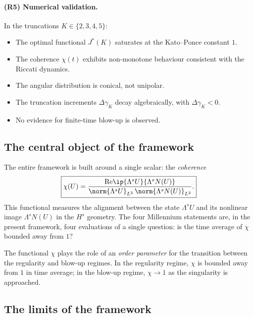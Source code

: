 \paragraph{(R5) Numerical validation.}
In the truncations $K\in\{2,3,4,5\}$:
\begin{itemize}[leftmargin=*]
\item The optimal functional $J^\ast(K)$ saturates at the 
      Kato--Ponce constant $1$.
\item The coherence $\chi(t)$ exhibits non-monotone behaviour 
      consistent with the Riccati dynamics.
\item The angular distribution is conical, not unipolar.
\item The truncation increments $\Delta\gamma_K$ decay 
      algebraically, with $\Delta\gamma_K<0$.
\item No evidence for finite-time blow-up is observed.
\end{itemize}

\subsection{The central object of the framework}
\label{ssec:central-object}

The entire framework is built around a single scalar: the 
\emph{coherence}
\begin{equation}\label{eq:chi-central}
\boxed{
\chi(U) = 
\frac{\mathrm{Re}\ip{\Lambda^s U}{\Lambda^s N(U)}}
     {\norm{\Lambda^s U}_{L^2}\,\norm{\Lambda^s N(U)}_{L^2}}.
}
\end{equation}
This functional measures the alignment between the state 
$\Lambda^s U$ and its nonlinear image $\Lambda^s N(U)$ in the 
$H^s$ geometry. The four Millennium statements are, in the present 
framework, four evaluations of a single question: is the time 
average of $\chi$ bounded away from $1$?

\begin{remark}\label{rem:order-param}
The functional $\chi$ plays the role of an \emph{order parameter} 
for the transition between the regularity and blow-up regimes. In 
the regularity regime, $\chi$ is bounded away from $1$ in time 
average; in the blow-up regime, $\chi\to 1$ as the singularity is 
approached.
\end{remark}

\subsection{The limits of the framework}
\label{ssec:limits-concl}

